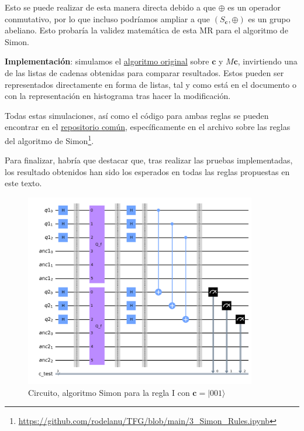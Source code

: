 Esto se puede realizar de esta manera directa debido a que $\oplus$ es un operador conmutativo, por lo que incluso podríamos ampliar a que $(S_{\mathbf{c}},\oplus)$ es un grupo abeliano. Esto probaría la validez matemática de esta MR para el algoritmo de Simon. \newline

\textbf{Implementación}: simulamos el \hyperref[Fig:CircuitoSimon1]{algoritmo original} sobre $\mathbf{c}$ y $M\mathbf{c}$, invirtiendo una de las listas de cadenas obtenidas para comparar resultados. Estos pueden ser representados directamente en forma de listas, tal y como está en el documento o con la representación en histograma tras hacer la modificación.\newline

Todas estas simulaciones, así como el código para ambas reglas se pueden encontrar en el \href{https://github.com/rodelanu/TFG/tree/main}{repositorio común}, específicamente en el archivo sobre las reglas del algoritmo de Simon\footnote{\url{https://github.com/rodelanu/TFG/blob/main/3_Simon_Rules.ipynb}}.\newline

Para finalizar, habría que destacar que, tras realizar las pruebas implementadas, los resultado obtenidos han sido los esperados en todas las reglas propuestas en este texto.

\begin{figure}[H]
    \centering
    \includegraphics[width=0.9\textwidth]{TFG/imagenes/simonregla.png}
    \caption{Circuito, algoritmo Simon para la regla I con $\mathbf{c}=|001\rangle$}
    \label{Fig:CircuitoSimonR1}
 \end{figure}


